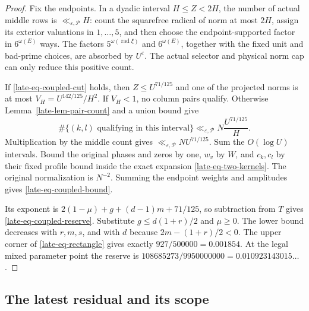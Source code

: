 \documentclass[11pt]{article}
\theoremstyle{definition}
\newcommand{\eps}{\varepsilon}
\newcommand{\lls}{\ll_{\eps,\mathcal P}}
\begin{document}
\begin{proof}
Fix the endpoints.  In a dyadic interval $H\le Z<2H$, the number of
actual middle rows is $\lls H$: count the squarefree radical of norm
at most $2H$, assign its exterior valuations in $1,\ldots,5$, and
then choose the endpoint-supported factor in $6^{\omega(E)}$
ways.  The factors $5^{\omega(\operatorname{rad}\xi)}$ and
$6^{\omega(E)}$, together with the fixed unit and bad-prime choices,
are absorbed by $U^\eps$.  The actual selector and physical norm cap
can only reduce this positive count.

If \eqref{late-eq-coupled-cut} holds, then $Z\le U^{71/125}$ and
one of the projected norms is at most
$V_H=U^{142/125}/H^2$.  If $V_H<1$, no column pairs qualify.
Otherwise Lemma~\ref{late-lem-pair-count} and a union bound give
\[
 \#\{(k,l)\text{ qualifying in this interval}\}
                     \lls N\frac{U^{71/125}}H.
\]
Multiplication by the middle count gives $\lls NU^{71/125}$.
Sum the $O(\log U)$ intervals.  Bound the original phases and zeros
by one, $w_v$ by $W$, and $c_k,c_l$ by their fixed profile bound
inside the exact expansion \eqref{late-eq-two-kernels}.  The original
normalization is $N^{-2}$.  Summing the endpoint weights and
amplitudes gives \eqref{late-eq-coupled-bound}.

Its exponent is $2(1-\mu)+g+(d-1)m+71/125$, so subtraction from
$T$ gives \eqref{late-eq-coupled-reserve}.  Substitute
$g\le d(1+r)/2$ and $\mu\ge0$.  The lower bound decreases with
$r,m,s$, and with $d$ because $2m-(1+r)/2<0$.  The upper corner of
\eqref{late-eq-rectangle} gives exactly
$927/500000=0.001854$.  At the legal mixed parameter point the
reserve is $108685273/9950000000=0.010923143015\ldots$.
\end{proof}

\subsection{The latest residual and its scope}
\label{late-final}
\end{document}
